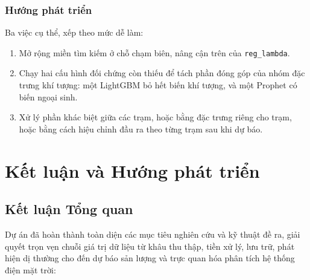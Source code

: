 \documentclass[12pt, a4paper]{report}
\begin{document}
\FloatBarrier
\subsection{Hướng phát triển}
\label{subsec:huong_phat_trien}

Ba việc cụ thể, xếp theo mức dễ làm:

\begin{enumerate}
    \item Mở rộng miền tìm kiếm ở chỗ chạm biên, nâng cận trên của \texttt{reg\_lambda}.
    \item Chạy hai cấu hình đối chứng còn thiếu để tách phần đóng góp của nhóm đặc trưng khí
    tượng: một LightGBM bỏ hết biến khí tượng, và một Prophet có biến ngoại sinh.
    \item Xử lý phần khác biệt giữa các trạm, hoặc bằng đặc trưng riêng cho trạm, hoặc bằng
    cách hiệu chỉnh đầu ra theo từng trạm sau khi dự báo.
\end{enumerate}


\setcounter{topnumber}{2}
\setcounter{bottomnumber}{1}
\setcounter{totalnumber}{3}
\renewcommand{\topfraction}{0.7}
\renewcommand{\bottomfraction}{0.3}
\renewcommand{\textfraction}{0.2}
\renewcommand{\floatpagefraction}{0.5}

\newpage

\chapter{Kết luận và Hướng phát triển}
\label{chap:conclusion}

\section{Kết luận Tổng quan}
\label{sec:conclusion}
Dự án đã hoàn thành toàn diện các mục tiêu nghiên cứu và kỹ thuật đề ra, giải quyết trọn vẹn chuỗi giá trị dữ liệu từ khâu thu thập, tiền xử lý, lưu trữ, phát hiện dị thường cho đến dự báo sản lượng và trực quan hóa phân tích hệ thống điện mặt trời:
\end{document}
